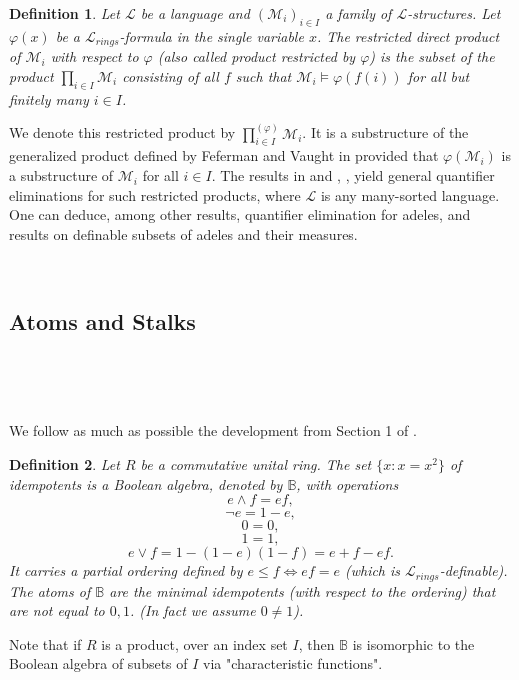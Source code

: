 \documentclass[12pt]{amsart}
\def\B{\mathbb{B}}
\def\cL{\mathcal{L}}
\def\cL{\mathcal{L}}
\def\cM{\mathcal M}
\newtheorem{Def}{Definition}[section]
\numberwithin{equation}{section}
\begin{document}
\begin{Def}\label{def-rest} Let $\cL$ be a language and $(\cM_i)_{i\in I}$ a family of $\cL$-structures. Let $\varphi(x)$ be a 
$\cL_{rings}$-formula in the single variable $x$. The restricted direct product of $\cM_i$ with respect to $\varphi$ (also called product restricted by $\varphi$) is the subset of the product $\prod_{i\in I} \cM_i$ consisting of all $f$ such that $\cM_i \models \varphi(f(i))$ for all but finitely many $i\in I$.\end{Def}

We denote this restricted product by $\prod_{i\in I}^{(\varphi)} \cM_i$. It is a substructure of the generalized product defined by Feferman and Vaught in \cite{FV} provided that $\varphi(\cM_i)$ is a substructure of $\cM_i$ for all $i\in I$. The results in \cite{FV} and \cite{DM-ad}, \cite{DM-ad2}, \cite{DM-supp} yield general quantifier eliminations for such restricted products, where $\cL$ is any many-sorted language. One can deduce, among other results, quantifier elimination for adeles, and results on definable subsets of adeles and their measures.


\

\subsection{Atoms and Stalks}

\

\

We follow as much as possible the development from Section 1 of \cite{elem-prod}.

\begin{Def} Let $R$ be a commutative unital ring. The set $\{x: x=x^2\}$ of idempotents
is a Boolean algebra, denoted by $\B$, with operations  
$$e \wedge f=ef,$$
$$\neg e=1-e,$$
$$0=0,$$
$$1=1,$$
$$e\vee f=1-(1-e)(1-f)=e+f-ef.$$
It carries a partial ordering defined by 
$e\leq f\Leftrightarrow ef=e$ (which is $\cL_{rings}$-definable). The {\it atoms} of $\B$ are the minimal idempotents (with respect to the ordering) that are not equal to $0,1$. 
(In fact we {\it assume} $0\neq 1$).\end{Def}

Note that if $R$ is a product, over an index set $I$, then $\B$ is isomorphic to the Boolean algebra of subsets of $I$ via 
"characteristic functions".
\end{document}
